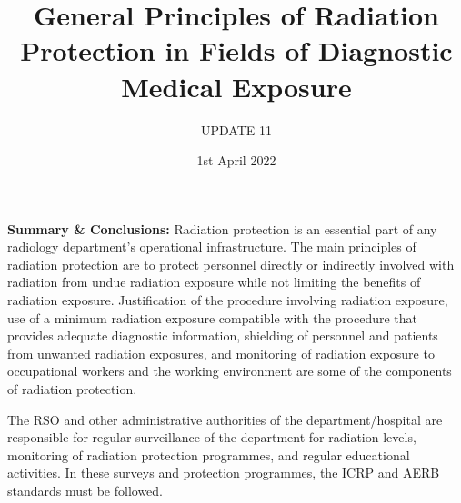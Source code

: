 \documentclass[12pt]{article}
\title{General Principles of Radiation Protection in Fields of Diagnostic Medical Exposure}
\author{UPDATE 11}
\date{1st April 2022}
\begin{document}
\maketitle

\textbf{Summary & Conclusions:}
Radiation protection is an essential part of any radiology department's operational infrastructure. The main principles of radiation protection are to protect personnel directly or indirectly involved with radiation from undue radiation exposure while not limiting the benefits of radiation exposure. Justification of the procedure involving radiation exposure, use of a minimum radiation exposure compatible with the procedure that provides adequate diagnostic information, shielding of personnel and patients from unwanted radiation exposures, and monitoring of radiation exposure to occupational workers and the working environment are some of the components of radiation protection.

\raggedright The RSO and other administrative authorities of the department/hospital are responsible for regular surveillance of the department for radiation levels, monitoring of radiation protection programmes, and regular educational activities. In these surveys and protection programmes, the ICRP and AERB standards must be followed.
\end{document}
